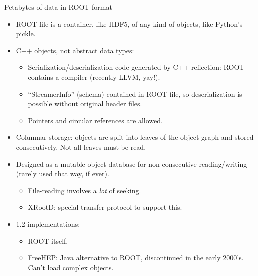 \documentclass{beamer}
\begin{document}
\begin{frame}{Petabytes of data in ROOT format}
\vspace{0.25 cm}
\begin{itemize}
\item ROOT file is a container, like HDF5, of any kind of objects, like Python's pickle.
\item C++ objects, not abstract data types:
\begin{itemize}
\item Serialization/deserialization code generated by C++ reflection: ROOT contains a compiler (recently LLVM, yay!).
\item ``StreamerInfo'' (schema) contained in ROOT file, so deserialization is possible without original header files.
\item Pointers and circular references are allowed.
\end{itemize}
\item Columnar storage: objects are split into leaves of the object graph and stored consecutively. Not all leaves must be read.
\item Designed as a mutable object database for non-consecutive reading/writing (rarely used that way, if ever).
\begin{itemize}
\item File-reading involves a {\it lot} of seeking.
\item XRootD: special transfer protocol to support this.
\end{itemize}
\item 1.2 implementations:
\begin{itemize}
\item ROOT itself.
\item FreeHEP: Java alternative to ROOT, discontinued in the early 2000's. Can't load complex objects.
\end{itemize}
\end{itemize}
\end{frame}
\end{document}
